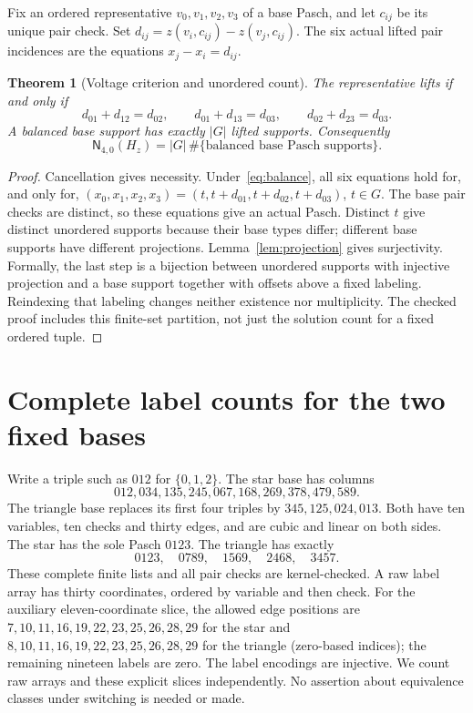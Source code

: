 \documentclass[11pt]{article}
\newtheorem{theorem}{Theorem}[section]
\newcommand{\Nf}{\mathsf N_{4,0}}
\begin{document}
Fix an ordered representative $v_0,v_1,v_2,v_3$ of a base Pasch, and let
$c_{ij}$ be its unique pair check. Set $d_{ij}=z(v_i,c_{ij})-z(v_j,c_{ij})$.
The six actual lifted pair incidences are the equations $x_j-x_i=d_{ij}$.
\begin{theorem}[Voltage criterion and unordered count]\label{thm:voltage}
The representative lifts if and only if
\begin{equation}\label{eq:balance}
 d_{01}+d_{12}=d_{02},\qquad d_{01}+d_{13}=d_{03},\qquad
 d_{02}+d_{23}=d_{03}.
\end{equation}
A balanced base support has exactly $|G|$ lifted supports. Consequently
\begin{equation}\label{eq:global}
 \Nf(H_z)=|G|\,\#\{\text{balanced base Pasch supports}\}.
\end{equation}
\end{theorem}
\begin{proof}
Cancellation gives necessity. Under~\eqref{eq:balance}, all six equations hold
for, and only for,
$(x_0,x_1,x_2,x_3)=(t,t+d_{01},t+d_{02},t+d_{03})$, $t\in G$.
The base pair checks are distinct, so these equations give an actual Pasch.
Distinct $t$ give distinct unordered supports because their base types differ;
different base supports have different projections. Lemma~\ref{lem:projection}
gives surjectivity. Formally, the last step is a bijection between unordered
supports with injective projection and a base support together with offsets
above a fixed labeling. Reindexing that labeling changes neither existence nor
multiplicity. The checked proof includes this finite-set partition, not just
the solution count for a fixed ordered tuple.
\end{proof}

\section{Complete label counts for the two fixed bases}
Write a triple such as $012$ for $\{0,1,2\}$. The star base has columns
\[
012,034,135,245,067,168,269,378,479,589.
\]
The triangle base replaces its first four triples by $345,125,024,013$.
Both have ten variables, ten checks and thirty edges, and are cubic and linear
on both sides. The star has the sole Pasch $0123$. The triangle has exactly
\[
0123,\quad0789,\quad1569,\quad2468,\quad3457.
\]
These complete finite lists and all pair checks are kernel-checked. A raw label
array has thirty coordinates, ordered by variable and then check. For the auxiliary eleven-coordinate slice, the allowed edge positions are
$7,10,11,16,19,22,23,25,26,28,29$ for the star and
$8,10,11,16,19,22,23,25,26,28,29$ for the triangle (zero-based indices);
the remaining nineteen labels are zero. The label encodings are injective.
We count raw arrays and these explicit slices independently. No assertion
about equivalence classes under switching is needed or made.
\end{document}
